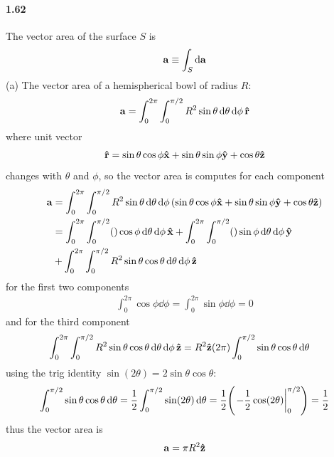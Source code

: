 \documentclass[../main.tex]{subfiles}
\begin{document}
\paragraph{1.62}
The vector area of the surface $S$ is 
\begin{align*}
    \vb{a} \equiv \int_S \dd{\vb{a}}
\end{align*}
(a) The vector area of a hemispherical bowl of radius $R$:
\begin{align*}
    \vb{a} = \int_0^{2\pi} \int_0^{\pi/2} R^2 \sin\theta \dd{\theta} \dd{\phi} \vu{r}
\end{align*}
where unit vector
\begin{align*}
    \vu{r} = \sin\theta \cos\phi \vu{x} + \sin\theta \sin\phi \vu{y} + \cos\theta \vu{z}
\end{align*}
changes with $\theta$ and $\phi$, so the vector area is computes for each component
\begin{align*}
    \vb{a} &= \int_0^{2\pi} \int_0^{\pi/2} R^2 \sin\theta \dd{\theta} \dd{\phi} 
        (\sin\theta \cos\phi \vu{x} + \sin\theta \sin\phi \vu{y} + \cos\theta \vu{z}) \\
    &= \int_0^{2\pi} \int_0^{\pi/2} () \cos\phi \dd{\theta} \dd{\phi} \vu{x}
        + \int_0^{2\pi} \int_0^{\pi/2} () \sin\phi \dd{\theta} \dd{\phi} \vu{y} \\
        &+ \int_0^{2\pi} \int_0^{\pi/2} R^2 \sin\theta \cos\theta \dd{\theta} \dd{\phi} \vu{z}
\end{align*}
for the first two components
\begin{align*}
    \int_0^{2\pi} \cos\phi \dd{\phi} = \int_0^{2\pi} \sin\phi \dd{\phi} = 0
\end{align*}
and for the third component
\begin{align*}
    \int_0^{2\pi} \int_0^{\pi/2} R^2 \sin\theta \cos\theta \dd{\theta} \dd{\phi} \vu{z}
    &= R^2 \vu{z} (2\pi) \int_0^{\pi/2} \sin\theta \cos\theta \dd{\theta}
\end{align*}
using the trig identity $\sin(2\theta) = 2\sin\theta \cos\theta$:
\begin{align*}
    \int_0^{\pi/2} \sin\theta \cos\theta \dd{\theta}
    = \frac{1}{2} \int_0^{\pi/2} \sin(2\theta) \dd{\theta}
    = \frac{1}{2} \qt(\eval{-\frac{1}{2} \cos(2\theta)}_0^{\pi/2}) = \frac{1}{2} 
\end{align*}
thus the vector area is
\begin{align*}
    \vb{a} = \pi R^2 \vu{z}
\end{align*}
\end{document}
